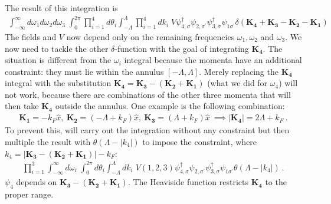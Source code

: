 \documentclass{article}
\begin{document}
The result of this integration is
\begin{equation}\begin{aligned}
	\int_{-\infty}^\infty d\omega_1 d\omega_2 d\omega_3\;\int_0^{2\pi} \prod_{i=1}^4 d \theta_i \int_{-\Lambda}^{\Lambda}\prod_{i=1}^4 dk_i \;V\psi_{4,\sigma}^\dagger\psi_{2,\sigma^\prime}\psi_{3,\sigma}^\dagger\psi_{1\sigma^\prime} \delta(\mathbf{K_4}+\mathbf{K_3} - \mathbf{K_2} - \mathbf{K_1})
\end{aligned}\end{equation}
The fields and \(V\) now depend only on the remaining frequencies \(\omega_1,\omega_2\) and \(\omega_3\). We now need to tackle the other \(\delta\)-function with the goal of integrating \(\mathbf{K_4}\). The situation is different from the \(\omega_i\) integral because the momenta have an additional constraint: they must lie within the annulus \(\left[-\Lambda,\Lambda\right]\). Merely replacing the \(\mathbf{K_4}\) integral with the substitution \(\mathbf{K_4} = \mathbf{K_3} - (\mathbf{K_2} + \mathbf{K_1})\) (what we did for \(\omega_4\)) will not work, because there are combinations of the other three momenta that will then take \(\mathbf{K_4}\) outside the annulus. One example is the following combination:
\begin{equation}\begin{aligned}
	\mathbf{K_1} = -k_F \hat x,~\mathbf{K_2} = \left(-\Lambda + k_F\right)\hat x,~\mathbf{K_3} = \left( \Lambda + k_F \right) \hat x~\implies |\mathbf{K_4}| = 2\Lambda + k_F~.
\end{aligned}\end{equation}
To prevent this, will carry out the integration without any constraint but then multiple the result with \(\theta(\Lambda - |k_4|)\) to impose the constraint, where \(k_4 = |\mathbf{K_3} - (\mathbf{K_2} + \mathbf{K_1})| - k_F\):
\begin{equation}\begin{aligned}
	\prod_{i=1}^3\int_{-\infty}^\infty d\omega_i\;\int_0^{2\pi} d\theta_i \int_{-\Lambda}^{\Lambda}dk_i \;V(1,2,3)\psi_{4,\sigma}^\dagger\psi_{2,\sigma^\prime}\psi_{3,\sigma}^\dagger\psi_{1\sigma^\prime}\theta(\Lambda - |k_4|)~.
\end{aligned}\end{equation}
\(\psi_{4}\) depends on \(\mathbf{K_3} - (\mathbf{K_2} + \mathbf{K_1})\). The Heaviside function restricts \(\mathbf{K_4}\) to the proper range.
\end{document}
